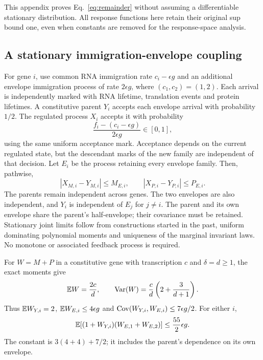 This appendix proves Eq.~\eqref{eq:remainder} without assuming a
differentiable stationary distribution. All response functions here
retain their original sup bound one, even when constants are removed
for the response-space analysis.

\subsection{A stationary immigration-envelope coupling}

For gene $i$, use common RNA immigration rate $c_i-\epsilon g$ and
an additional envelope immigration process of rate $2\epsilon g$,
where $(c_1,c_2)=(1,2)$. Each arrival is independently marked with
RNA lifetime, translation events and protein lifetimes. A constitutive
parent $Y_i$ accepts each envelope arrival with probability $1/2$.
The regulated process $X_i$ accepts it with probability
\begin{equation}
 \frac{f_i-(c_i-\epsilon g)}{2\epsilon g}\in[0,1],
\end{equation}
using the same uniform acceptance mark. Acceptance depends on the
current regulated state, but the descendant marks of the new family
are independent of that decision. Let $E_i$ be the process retaining
every envelope family. Then, pathwise,
\begin{equation}
 |X_{M,i}-Y_{M,i}|\leq M_{E,i},\qquad
 |X_{P,i}-Y_{P,i}|\leq P_{E,i}.
 \label{eq:envelope}
\end{equation}
The parents remain independent across genes. The two envelopes are
also independent, and $Y_i$ is independent of $E_j$ for $j\ne i$.
The parent and its own envelope share the parent's half-envelope;
their covariance must be retained. Stationary joint limits follow
from constructions started in the past, uniform dominating
polynomial moments and uniqueness of the marginal invariant laws.
No monotone or associated feedback process is required.

For $W=M+P$ in a constitutive gene with transcription $c$ and
$\delta=d\geq1$, the exact moments give
\begin{equation}
 \mathbb E W=\frac{2c}{d},\qquad
 \operatorname{Var}(W)=\frac cd\left(2+\frac3{d+1}\right).
\end{equation}
Thus $\mathbb E W_{Y,i}=2$, $\mathbb E W_{E,i}\leq4\epsilon g$ and
$\operatorname{Cov}(W_{Y,i},W_{E,i})\leq7\epsilon g/2$.
For either $i$,
\begin{equation}
 \mathbb E[(1+W_{Y,i})(W_{E,1}+W_{E,2})]
 \leq \frac{55}{2}\epsilon g.
 \label{eq:weightedmoment}
\end{equation}
The constant is $3(4+4)+7/2$; it includes the parent's
dependence on its own envelope.

